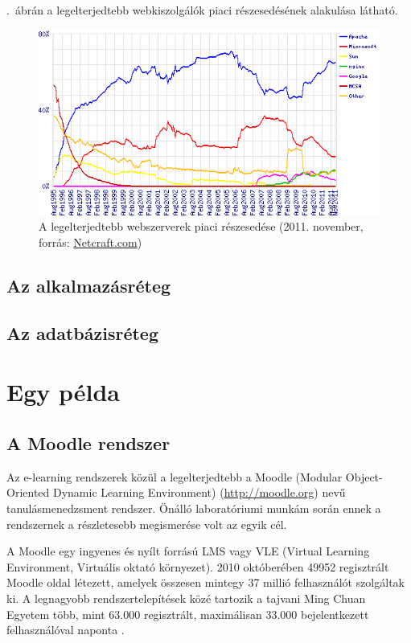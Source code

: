 .~ábrán a legelterjedtebb webkiszolgálók piaci részesedésének alakulása látható.

\begin{figure}[h!]
\centering
\includegraphics[width=1.0\textwidth]{figures/wpid-overallc.png}
\caption{A legelterjedtebb webszerverek piaci részesedése (2011. november, forrás: \href{http://news.netcraft.com/archives/2011/11/07/november-2011-web-server-survey.html}{Netcraft.com}) \label{fig:netcraft_webservers}}
\end{figure} 


\subsection{Az alkalmazásréteg}
\subsection{Az adatbázisréteg}

\section{Egy példa}
\subsection{A Moodle rendszer}
Az e-learning rendszerek közül a legelterjedtebb a Moodle (Modular Object-Oriented Dynamic Learning Environment) (\href{http://moodle.org}{http://moodle.org}) nevű tanulásmenedzsment rendszer. Önálló laboratóriumi munkám során ennek a rendszernek a részletesebb megismerése volt az egyik cél.

A Moodle  egy ingyenes és nyílt forrású LMS vagy VLE (Virtual Learning Environment, Virtuális oktató környezet). 2010 októberében 49952 regisztrált Moodle oldal létezett, amelyek összesen mintegy 37 millió felhasználót szolgáltak ki. A legnagyobb rendszertelepítések közé tartozik a tajvani Ming Chuan Egyetem több, mint 63.000 regisztrált, maximálisan 33.000 bejelentkezett felhasználóval naponta \cite{moodleinst}.

